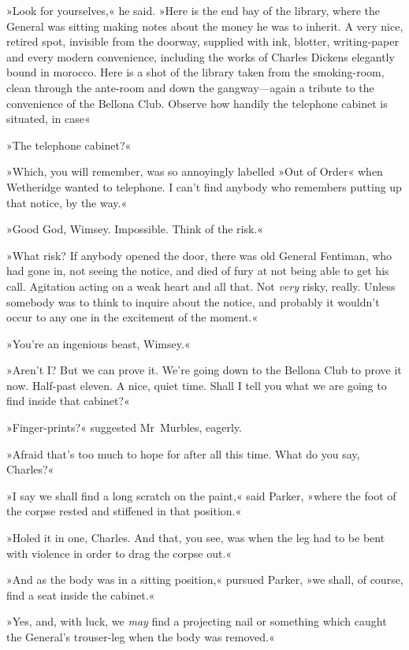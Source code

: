 »Look for yourselves,« he said. »Here is the end bay of the library, where the General was sitting making notes about the money he was to inherit. A very nice, retired spot, invisible from the doorway, supplied with ink, blotter, writing-paper and every modern convenience, including the works of Charles Dickens elegantly bound in morocco. Here is a shot of the library taken from the smoking-room, clean through the ante-room and down the gangway—again a tribute to the convenience of the Bellona Club. Observe how handily the telephone cabinet is situated, in case\longdash«

»The telephone cabinet?«

»Which, you will remember, was so annoyingly labelled »Out of Order« when Wetheridge wanted to telephone. I can't find anybody who remembers putting up that notice, by the way.«

»Good God, Wimsey. Impossible. Think of the risk.«

»What risk? If anybody opened the door, there was old General Fentiman, who had gone in, not seeing the notice, and died of fury at not being able to get his call. Agitation acting on a weak heart and all that. Not \textit{very} risky, really. Unless somebody was to think to inquire about the notice, and probably it wouldn't occur to any one in the excitement of the moment.«

»You're an ingenious beast, Wimsey.«

»Aren't I\@? But we can prove it. We're going down to the Bellona Club to prove it now. Half-past eleven. A nice, quiet time. Shall I tell you what we are going to find inside that cabinet?«

»Finger-prints?« suggested Mr~Murbles, eagerly.

»Afraid that's too much to hope for after all this time. What do you say, Charles?«

»I say we shall find a long scratch on the paint,« said Parker, »where the foot of the corpse rested and stiffened in that position.«

»Holed it in one, Charles. And that, you see, was when the leg had to be bent with violence in order to drag the corpse out.«

»And as the body was in a sitting position,« pursued Parker, »we shall, of course, find a seat inside the cabinet.«

»Yes, and, with luck, we \textit{may} find a projecting nail or something which caught the General's trouser-leg when the body was removed.«

